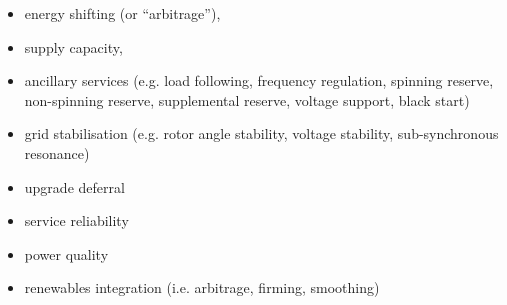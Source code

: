 \begin{itemize}
	\item energy shifting (or ``arbitrage''),
	\item supply capacity,
	\item ancillary services (e.g. load following, frequency regulation, spinning reserve, non-spinning reserve, supplemental reserve, voltage support, black start)
	\item grid stabilisation (e.g. rotor angle stability, voltage stability, sub-synchronous resonance)
	\item upgrade deferral
	\item service reliability
	\item power quality
	\item renewables integration (i.e. arbitrage, firming, smoothing)
\end{itemize}
















